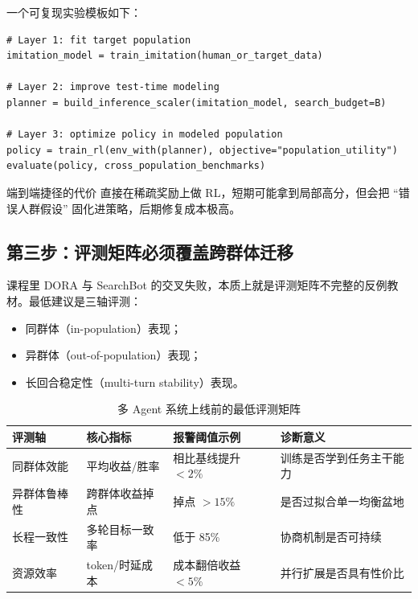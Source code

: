 一个可复现实验模板如下：
\begin{lstlisting}[caption={面向多人协作任务的三层训练模板}]
# Layer 1: fit target population
imitation_model = train_imitation(human_or_target_data)

# Layer 2: improve test-time modeling
planner = build_inference_scaler(imitation_model, search_budget=B)

# Layer 3: optimize policy in modeled population
policy = train_rl(env_with(planner), objective="population_utility")
evaluate(policy, cross_population_benchmarks)
\end{lstlisting}

\begin{warningbox}{端到端捷径的代价}
直接在稀疏奖励上做 RL，短期可能拿到局部高分，但会把 ``错误人群假设'' 固化进策略，后期修复成本极高。
\end{warningbox}

\subsection{第三步：评测矩阵必须覆盖跨群体迁移}
课程里 DORA 与 SearchBot 的交叉失败，本质上就是评测矩阵不完整的反例教材。最低建议是三轴评测：
\begin{itemize}
    \item 同群体（in-population）表现；
    \item 异群体（out-of-population）表现；
    \item 长回合稳定性（multi-turn stability）表现。
\end{itemize}

\begin{table}[H]
\centering
\begin{tabular}{p{3.2cm}p{3.0cm}p{3.0cm}p{3.8cm}}
\toprule
\textbf{评测轴} & \textbf{核心指标} & \textbf{报警阈值示例} & \textbf{诊断意义} \\
\midrule
同群体效能 & 平均收益/胜率 & 相比基线提升 $<2\%$ & 训练是否学到任务主干能力 \\
异群体鲁棒性 & 跨群体收益掉点 & 掉点 $>15\%$ & 是否过拟合单一均衡盆地 \\
长程一致性 & 多轮目标一致率 & 低于 85\% & 协商机制是否可持续 \\
资源效率 & token/时延成本 & 成本翻倍收益 $<5\%$ & 并行扩展是否具有性价比 \\
\bottomrule
\end{tabular}
\caption{多 Agent 系统上线前的最低评测矩阵}
\end{table}

